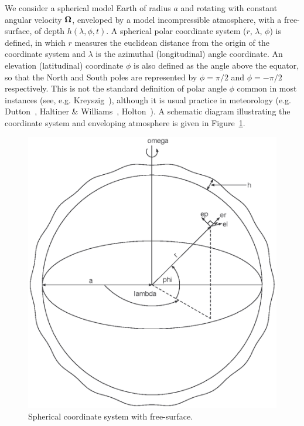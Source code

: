 We consider a spherical model Earth of radius $a$ and rotating with constant angular velocity $\mathbf{\Omega}$, enveloped by a model incompressible atmosphere, with a free-surface, of depth $h(\lambda,\phi,t)$. A spherical polar coordinate system ($r$, $\lambda$, $\phi$) is defined, in which $r$ measures the euclidean distance from the origin of the coordinate system and $\lambda$ is the azimuthal (longitudinal) angle coordinate. An elevation (latitudinal) coordinate $\phi$ is also defined as the angle above the equator, so that the North and South poles are represented by $\phi=\pi/2$ and $\phi=-\pi/2$ respectively. This is not the standard definition of polar angle $\phi$ common in most instances (see, e.g. Kreyszig~\cite[pages 498-499]{Kreyszig:AEM}), although it is usual practice in meteorology (e.g. Dutton~\cite{Dutton:CW}, Haltiner \& Williams~\cite{Haltiner:NPD}, Holton~\cite{Holton:IDM}). A schematic diagram illustrating the coordinate system and enveloping atmosphere is given in Figure~\ref{fig:coordsys}.
\begin{figure}[htbp]
	\centering
  \includegraphics[scale=0.65]{IMAGES/fig1.eps}
  \caption{Spherical coordinate system with free-surface.}
  \label{fig:coordsys}
\end{figure}

